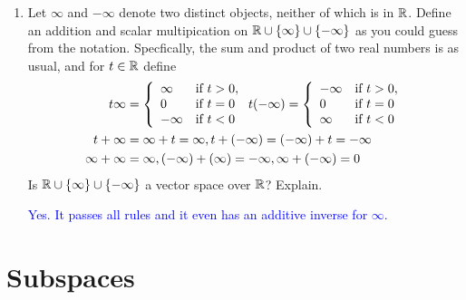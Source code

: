 \documentclass[10pt,a4paper]{report}
\newcommand{\BLUE}[1]{\textcolor{blue}{#1}}
\begin{document}
\begin{enumerate}
\item Let $\infty$ and $-\infty$ denote two distinct objects, neither of which is in $\mathbb{R}$.  Define an addition and scalar multipication on $\mathbb{R} \cup \{\infty\}\cup\{-\infty\}$ as you could guess from the notation.  Specfically, the sum and product of two real numbers is as usual, and for $t \in \mathbb{R}$ define
\begin{align*}
	t\infty &= \left \{ \begin{array}{ll}
		\infty & \text{if } t > 0,\\
		0 & \text{if } t=0 \\
		-\infty & \text{if } t <0	
	\end{array}  \right .  	
	t(-\infty) = \left \{ \begin{array}{ll}
		-\infty & \text{if } t > 0,\\
		0 & \text{if } t=0 \\
		\infty & \text{if } t <0	
	\end{array}  \right .  \\	
	t+\infty &= \infty+t=\infty, t+(-\infty)=(-\infty)+t=-\infty \\
	\infty+\infty&=\infty, (-\infty)+(\infty)= -\infty, \infty+(-\infty) = 0
\end{align*}  
Is $\mathbb{R}\cup\{\infty\}\cup\{-\infty\}$ a vector space over $\mathbb{R}$?  Explain.

\BLUE{Yes.  It passes all rules and it even has an additive inverse for $\infty$.
}

\end{enumerate}

\section{Subspaces}
\end{document}
